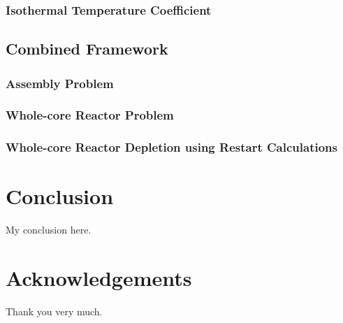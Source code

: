 \documentclass[11pt,a4paper,onecolumn,oneside]{report}
\begin{document}
\subsubsection{Isothermal Temperature Coefficient}

\subsection{Combined Framework}
\subsubsection{Assembly Problem}
\subsubsection{Whole-core Reactor Problem}
\subsubsection{Whole-core Reactor Depletion using Restart Calculations}


\newpage 
\section{Conclusion} 
My conclusion here.

\clearpage



\clearpage

\section*{\hfill \Large Acknowledgements \hfill}
Thank you very much.
\clearpage


\hbox{ }
\thispagestyle{empty}
\clearpage
\end{document}
